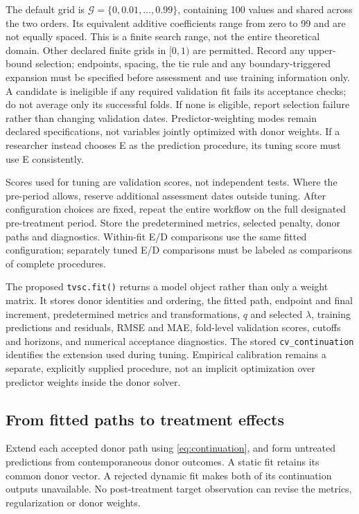 \documentclass[11pt]{article}
\begin{document}
The default grid is $\mathcal G=\{0,0.01,\ldots,0.99\}$, containing
100 values and shared across the two orders. Its equivalent additive
coefficients range from zero to 99 and are not equally spaced. This is
a finite search range, not the entire theoretical domain. Other declared
finite grids in $[0,1)$ are permitted. Record any upper-bound selection;
endpoints, spacing, the tie rule and any boundary-triggered expansion must
be specified before assessment and use training information only.
A candidate is ineligible if any required validation fit fails its
acceptance checks; do not average only its successful folds. If none is
eligible, report selection failure rather than changing validation dates.
Predictor-weighting modes remain declared specifications, not variables
jointly optimized with donor weights. If a researcher instead chooses E
as the prediction procedure, its tuning score must use E consistently.

Scores used for tuning are validation scores, not independent tests.
Where the pre-period allows, reserve additional assessment dates outside
tuning. After configuration choices are fixed, repeat the entire workflow
on the full designated pre-treatment period. Store the predetermined metrics,
selected penalty, donor paths and diagnostics. Within-fit E/D comparisons
use the same fitted configuration; separately tuned E/D comparisons must
be labeled as comparisons of complete procedures.

The proposed \texttt{tvsc.fit()} returns a model object rather than only
a weight matrix. It stores donor identities and ordering, the fitted path,
endpoint and final increment, predetermined metrics and transformations,
$q$ and selected $\lambda$, training predictions and residuals, RMSE and
MAE, fold-level validation scores, cutoffs and horizons, and numerical
acceptance diagnostics. The stored \texttt{cv\_continuation} identifies
the extension used during tuning. Empirical calibration remains a separate,
explicitly supplied procedure, not an implicit optimization over predictor
weights inside the donor solver.

\subsection{From fitted paths to treatment effects}
Extend each accepted donor path using \eqref{eq:continuation}, and form
untreated predictions from contemporaneous donor outcomes. A static fit
retains its common donor vector. A rejected dynamic fit makes both of its
continuation outputs unavailable. No post-treatment target observation
can revise the metrics, regularization or donor weights.
\end{document}
